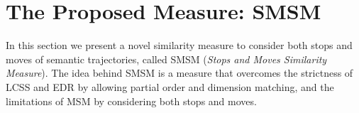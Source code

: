 \documentclass[12pt]{article}
\begin{document}
\begin{table}[h!]
\scriptsize
  \centering
  \caption{Comparative table}
  \label{tab:comparative_table}
\end{table}

\section{The Proposed Measure: SMSM} \label{sec:proposed_measure}
In this section we present a novel similarity measure to consider both stops and moves of semantic trajectories, called SMSM (\textit{Stops and Moves Similarity Measure}). The idea behind SMSM is a measure that overcomes the strictness of LCSS and EDR by allowing partial order and dimension matching, and the limitations of MSM by considering both stops and moves.
\end{document}
